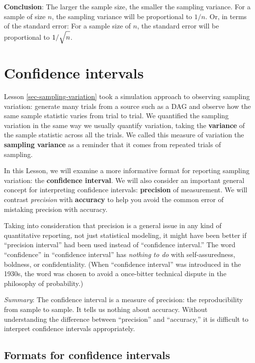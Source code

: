 \documentclass[
  letterpaper,
  DIV=11,
  numbers=noendperiod,
  oneside]{scrartcl}
\begin{document}
\textbf{Conclusion}: The larger the sample size, the smaller the
sampling variance. For a sample of size \(n\), the sampling variance
will be proportional to \(1/n\). Or, in terms of the standard error: For
a sample size of \(n\), the standard error will be proportional to
\(1/\sqrt{\strut n}\).

\newpage

\section{Confidence intervals}\label{sec-confidence-intervals}

Lesson \ref{sec-sampling-variation} took a simulation approach to
observing sampling variation: generate many trials from a source such as
a DAG and observe how the same sample statistic varies from trial to
trial. We quantified the sampling variation in the same way we usually
quantify variation, taking the \textbf{variance} of the sample statistic
across all the trials. We called this measure of variation the
\textbf{sampling variance} as a reminder that it comes from repeated
trials of sampling.

In this Lesson, we will examine a more informative format for reporting
sampling variation: the \textbf{confidence interval}. We will also
consider an important general concept for interpreting confidence
intervals: \textbf{precision} of measurement. We will contrast
\emph{precision} with \textbf{accuracy} to help you avoid the common
error of mistaking precision with accuracy.

Taking into consideration that precision is a general issue in any kind
of quantitative reporting, not just statistical modeling, it might have
been better if ``precision interval'' had been used instead of
``confidence interval.'' The word ``confidence'' in ``confidence
interval'' has \emph{nothing to do} with self-assuredness, boldness, or
confidentiality. (When ``confidence interval'' was introduced in the
1930s, the word was chosen to avoid a once-bitter technical dispute in
the philosophy of probability.)

\emph{Summary}: The confidence interval is a measure of precision: the
reproducibility from sample to sample. It tells us nothing about
accuracy. Without understanding the difference between ``precision'' and
``accuracy,'' it is difficult to interpret confidence intervals
appropriately.

\subsection{Formats for confidence
intervals}\label{formats-for-confidence-intervals}
\end{document}
